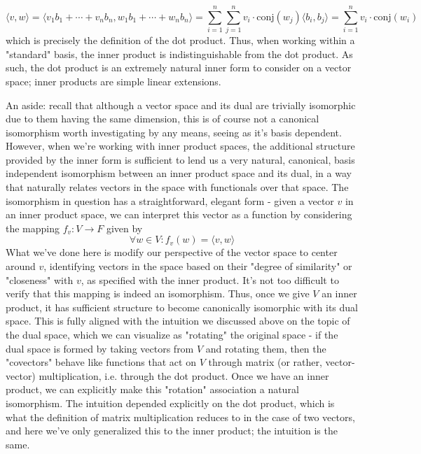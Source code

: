 \documentclass{article}
\newcommand{\n}{\leavevmode \newline}
\newcommand{\nn}{\leavevmode \newline \newline}
\begin{document}
    $$ \langle v, w \rangle = \langle v_1 b_1 + \cdots + v_n b_n, w_1 b_1 + \cdots + w_n b_n \rangle = \sum_{i = 1}^n \sum_{j = 1}^n v_i \cdot \text{conj}(w_j) \langle b_i, b_j \rangle = \sum_{i = 1}^n v_i \cdot \text{conj}(w_i) $$
which is precisely the definition of the dot product. Thus, when working within a "standard" basis, the inner product is indistinguishable from the dot product. As such, the dot product is an extremely natural inner form to consider on a vector space; inner products are simple linear extensions.
\n
\begin{adjustwidth}{1cm}{1cm}

    An aside: recall that although a vector space and its dual are trivially isomorphic due to them having the same dimension, this is of course not a canonical isomorphism worth investigating by any means, seeing as it's basis dependent. However, when we're working with inner product spaces, the additional structure provided by the inner form is sufficient to lend us a very natural, canonical, basis independent isomorphism between an inner product space and its dual, in a way that naturally relates vectors in the space with functionals over that space.
    \nn
    The isomorphism in question has a straightforward, elegant form - given a vector $ v $ in an inner product space, we can interpret this vector as a function by considering the mapping $ f_v: V \rightarrow F $ given by
        $$ \forall w \in V: f_v(w) = \langle v, w \rangle $$
    What we've done here is modify our perspective of the vector space to center around $ v $, identifying vectors in the space based on their "degree of similarity" or "closeness" with $ v $, as specified with the inner product. It's not too difficult to verify that this mapping is indeed an isomorphism. Thus, once we give $ V $ an inner product, it has sufficient structure to become canonically isomorphic with its dual space. This is fully aligned with the intuition we discussed above on the topic of the dual space, which we can visualize as "rotating" the original space - if the dual space is formed by taking vectors from $ V $ and rotating them, then the "covectors" behave like functions that act on $ V $  through matrix (or rather, vector-vector) multiplication, i.e. through the dot product. Once we have an inner product, we can explicitly make this "rotation" association a natural isomorphism. The intuition depended explicitly on the dot product, which is what the definition of matrix multiplication reduces to in the case of two vectors, and here we've only generalized this to the inner product; the intuition is the same.

\end{adjustwidth}
\end{document}
